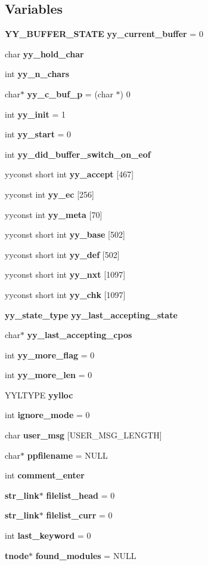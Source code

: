 \subsection*{Variables}
\begin{CompactItemize}
\item 
{\bf YY\_\-BUFFER\_\-STATE} {\bf yy\_\-current\_\-buffer} = 0
\item 
char {\bf yy\_\-hold\_\-char}
\item 
int {\bf yy\_\-n\_\-chars}
\item 
char$\ast$ {\bf yy\_\-c\_\-buf\_\-p} = (char $\ast$) 0
\item 
int {\bf yy\_\-init} = 1
\item 
int {\bf yy\_\-start} = 0
\item 
int {\bf yy\_\-did\_\-buffer\_\-switch\_\-on\_\-eof}
\item 
yyconst short int {\bf yy\_\-accept} [467]
\item 
yyconst int {\bf yy\_\-ec} [256]
\item 
yyconst int {\bf yy\_\-meta} [70]
\item 
yyconst short int {\bf yy\_\-base} [502]
\item 
yyconst short int {\bf yy\_\-def} [502]
\item 
yyconst short int {\bf yy\_\-nxt} [1097]
\item 
yyconst short int {\bf yy\_\-chk} [1097]
\item 
{\bf yy\_\-state\_\-type} {\bf yy\_\-last\_\-accepting\_\-state}
\item 
char$\ast$ {\bf yy\_\-last\_\-accepting\_\-cpos}
\item 
int {\bf yy\_\-more\_\-flag} = 0
\item 
int {\bf yy\_\-more\_\-len} = 0
\item 
YYLTYPE {\bf yylloc}
\item 
int {\bf ignore\_\-mode} = 0
\item 
char {\bf user\_\-msg} [USER\_\-MSG\_\-LENGTH]
\item 
char$\ast$ {\bf ppfilename} = NULL
\item 
int {\bf comment\_\-enter}
\item 
{\bf str\_\-link}$\ast$ {\bf filelist\_\-head} = 0
\item 
{\bf str\_\-link}$\ast$ {\bf filelist\_\-curr} = 0
\item 
int {\bf last\_\-keyword} = 0
\item 
{\bf tnode}$\ast$ {\bf found\_\-modules} = NULL
\item 

\end{CompactItemize}
